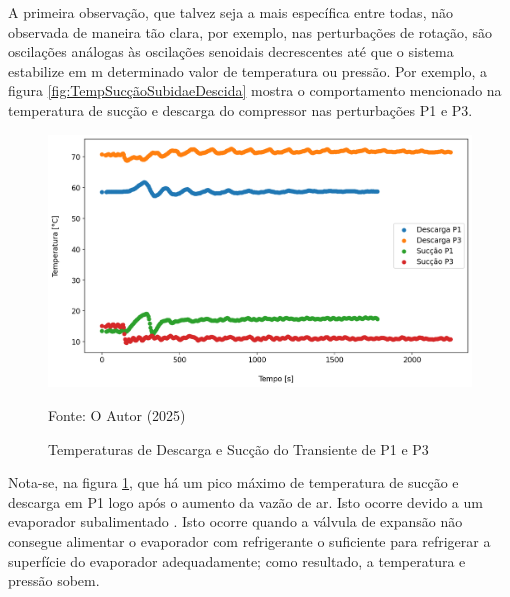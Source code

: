 A primeira observação, que talvez seja a mais específica entre todas, não observada de maneira tão clara, por exemplo, nas perturbações de rotação, são oscilações análogas às oscilações senoidais decrescentes até que o sistema estabilize em m determinado valor de temperatura ou pressão. Por exemplo, a figura \ref{fig:TempSucçãoSubidaeDescida} mostra o comportamento mencionado na temperatura de sucção e descarga do compressor nas perturbações P1 e P3.
\newpage
\begin{figure}[h]
    \centering
    \includegraphics[width=1\linewidth]{FigurasdoTexto/Temperaturas de descarga e sucção Transiente P1 e P3.png}
    \caption{Temperaturas de Descarga e Sucção do Transiente de P1 e P3}
    \label{fig:TempSuccaoPertubacaoVentilador}
    {\footnotesize Fonte: O Autor (2025)}
\end{figure}

Nota-se, na figura \ref{fig:TempSuccaoPertubacaoVentilador}, que há um pico máximo de temperatura de sucção e descarga em P1 logo após o aumento da vazão de ar. Isto ocorre devido a um evaporador subalimentado \cite{StoekerRefrigeration}. Isto ocorre quando a válvula de expansão não consegue alimentar o evaporador com refrigerante o suficiente para refrigerar a superfície do evaporador adequadamente; como resultado, a temperatura e pressão sobem.

